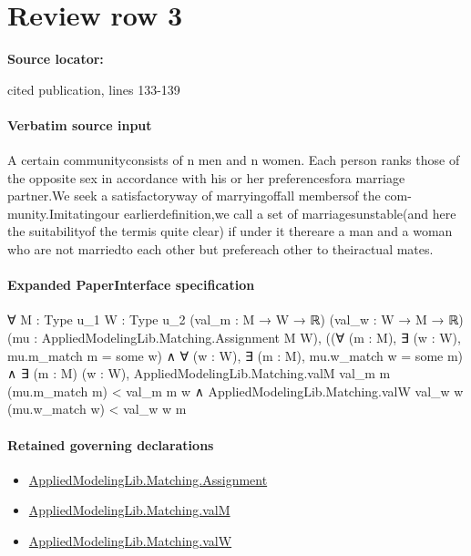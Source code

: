 \documentclass[10pt]{article}
\begin{document}
\section*{Review row 3}
\textbf{Source locator:} {\footnotesize\raggedright cited publication, lines 133-\allowbreak{}139\par}
\paragraph{Verbatim source input}
\begin{ReviewVerbatim}
A certain communityconsists of n men and n women. Each person ranks
those of the opposite sex in accordance with his or her preferencesfora marriage
partner.We seek a satisfactoryway of marryingoffall membersof the com-
munity.Imitatingour earlierdefinition,we call a set of marriagesunstable(and
here the suitabilityof the termis quite clear) if under it thereare a man and a
woman who are not marriedto each other but prefereach other to theiractual
mates.
\end{ReviewVerbatim}



\paragraph{Expanded PaperInterface specification}
\begin{ReviewVerbatim}
∀ {M : Type u_1} {W : Type u_2} (val_m : M → W → ℝ) (val_w : W → M → ℝ)
  (mu : AppliedModelingLib.Matching.Assignment M W),
  ((∀ (m : M), ∃ (w : W), mu.m_match m = some w) ∧ ∀ (w : W), ∃ (m : M), mu.w_match w = some m) ∧
    ∃ (m : M) (w : W),
      AppliedModelingLib.Matching.valM val_m m (mu.m_match m) < val_m m w ∧
        AppliedModelingLib.Matching.valW val_w w (mu.w_match w) < val_w w m
\end{ReviewVerbatim}

\paragraph{Retained governing declarations}
\begin{itemize}\raggedright
\item \hyperlink{governing-declaration-508c084086b006b8}{Applied\allowbreak{}Modeling\allowbreak{}Lib.\allowbreak{}Matching.\allowbreak{}Assignment}
\item \hyperlink{governing-declaration-3963208d135cca00}{Applied\allowbreak{}Modeling\allowbreak{}Lib.\allowbreak{}Matching.\allowbreak{}val\allowbreak{}M}
\item \hyperlink{governing-declaration-85f87c1f3ae178ac}{Applied\allowbreak{}Modeling\allowbreak{}Lib.\allowbreak{}Matching.\allowbreak{}val\allowbreak{}W}
\end{itemize}
\end{document}
